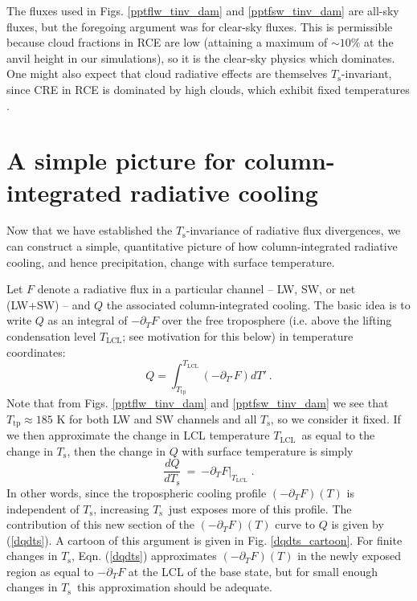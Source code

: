 \documentclass[10pt]{article}
\newcommand{\beqn}{\begin{equation}}
\newcommand{\eeqn}{\end{equation}}
\newcommand{\eqnref}[1]{(\ref{#1})}
\newcommand{\n}{\nonumber}
\newcommand{\der}[2]{\ensuremath{\frac{d #1}{d #2}}}
\newcommand{\ppt}{\ensuremath{\partial_T}}
\newcommand{\Ts}{\ensuremath{T_\mathrm{s}}}
\newcommand{\Tlcl}{\ensuremath{T_\mathrm{LCL}}}
\newcommand{\Ttp}{\ensuremath{T_\mathrm{tp}}}
\begin{document}
The fluxes used in Figs.  \ref{pptflw_tinv_dam} and \ref{pptfsw_tinv_dam} are all-sky fluxes, but the foregoing argument was for clear-sky fluxes. This is permissible because cloud fractions in RCE are low (attaining a maximum of $\sim 10 \%$ at the anvil height in our simulations), so it is the clear-sky physics which dominates. One might also expect that cloud radiative effects are themselves \Ts-invariant, since CRE in RCE is dominated by high clouds, which exhibit fixed temperatures \citep[i.e. the  Fixed-Anvil-Temperature hypothesis, see][]{harrop2012,hartmann2002}.
 
		
\section{A simple picture for column-integrated radiative cooling} \label{sec_simple_Q}

Now that we have established  the \Ts-invariance of radiative flux divergences, we can construct a simple, quantitative picture of how column-integrated radiative cooling, and hence precipitation,  change with surface temperature. 
	
	Let $F$ denote a radiative flux in a particular channel -- LW, SW, or net (LW+SW) -- and $Q$ the associated column-integrated cooling. The basic idea is to write $Q$ as an integral of $-\ppt F$ over the free troposphere (i.e. above the lifting condensation level \Tlcl; see motivation for this below) in temperature coordinates: 
	\beqn
		Q =  \int_{\Ttp}^{\Tlcl} (-\partial_{T'} F) dT' \ . 
		\n
	\eeqn
 Note that from Figs. \ref{pptflw_tinv_dam} and \ref{pptfsw_tinv_dam} we see that $\Ttp \approx 185$ K for both LW and SW channels and all \Ts, so we consider it fixed.   If we then approximate the change in LCL temperature \Tlcl\ as equal to the change in \Ts, then the change in $Q$ with surface temperature is  simply
	\beqn
		\der{Q}{\Ts} \ =\  \left.  -\ppt F\right|_{\Tlcl}  \; .
	\label{dqdts}
	\eeqn
In other words, since the tropospheric cooling profile $(-\ppt F)(T)$  is independent of \Ts, increasing \Ts\ just exposes more of this profile.  The contribution of this new section of the $(-\ppt F)(T)$ curve to $Q$ is given by \eqnref{dqdts}.  A cartoon of this argument is given in Fig. \ref{dqdts_cartoon}. For finite changes in \Ts, Eqn. \eqnref{dqdts} approximates $(-\ppt F)(T)$ in the newly exposed region as equal to $-\ppt F$ at the LCL of the base state, but for small enough changes in \Ts\ this approximation should be adequate.
\end{document}
